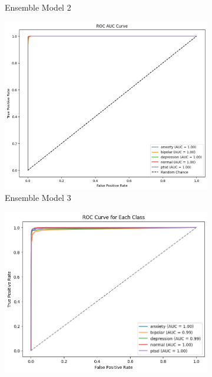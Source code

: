 \begin{figure}[H]
\begin{subfigure}[b]{0.47\textwidth}
        \caption{Ensemble Model 2}
        \label{em2 roc}  %
    \end{subfigure}
    \hfill
    \begin{subfigure}[b]{0.47\textwidth}
        \centering
        \includegraphics[width=\textwidth]{Images/EM3 ROC.png}
        \caption{Ensemble Model 3}
        \label{em3 roc}  %
    \end{subfigure}
    \hfill
    \begin{subfigure}[b]{0.48\textwidth}
        \centering
        \includegraphics[width=\textwidth]{Images/BAG ROC.png}

\end{subfigure}
\end{figure}
